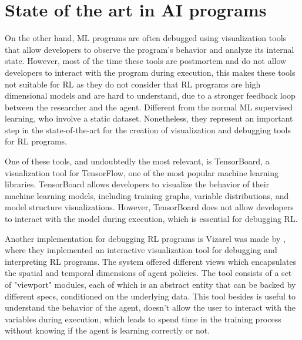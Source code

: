 \section{State of the art in \ac{AI} programs}
\label{sec:ai}

On the other hand, \ac{ML} programs are often debugged using visualization 
tools that allow developers to observe the program's behavior and analyze its internal state. 
However, most of the time these tools are postmortem and do not allow developers to interact 
with the program during execution, this makes these tools not suitable for \ac{RL} as they 
do not consider that \ac{RL} programs are high dimensional models and are hard to understand, 
due to a stronger feedback loop between the researcher and the agent. Different from the normal 
\ac{ML} supervised learning, who involve a static dataset. Nonetheless, they 
represent an important step in the state-of-the-art for the creation of visualization 
and debugging tools for \ac{RL} programs.

One of these tools, and undoubtedly the most relevant, is TensorBoard\cite{tensorboard}, a 
visualization tool for TensorFlow, one of the most popular machine learning libraries. 
TensorBoard allows developers to visualize the behavior of their machine learning models, 
including training graphs, variable distributions, and model structure visualizations. However, 
TensorBoard does not allow developers to interact with the model during execution, which is 
essential for debugging \ac{RL}.

Another implementation for debugging \ac{RL} programs is \ac{Vizarel} was made by \citet{deshpande2020interactivevisualizationdebuggingrl},
where they implemented an interactive visualization tool for debugging and interpreting \ac{RL} 
programs. The system offered different views which encapsulates the spatial and temporal dimensions 
of agent policies. The tool consists of a set of "viewport" modules, each of which is an abstract 
entity that can be backed by different specs, conditioned on the underlying data\citet{deshpande2020interactivevisualizationdebuggingrl}. This tool besides 
is useful to understand the behavior of the agent, doesn't allow the user to interact with the 
variables during execution, which leads to spend time in the training process without knowing if
the agent is learning correctly or not.

